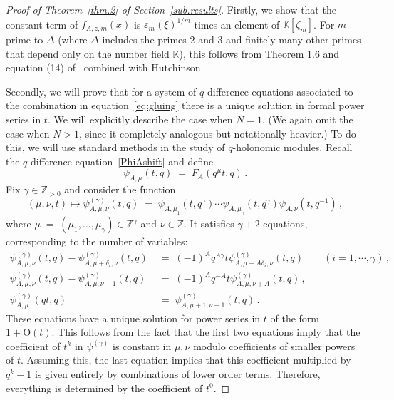 \documentclass[12pt,reqno]{amsart}
\theoremstyle{definition}
\def\BZ{\mathbb Z}
\def\BK{\mathbb K}
\def\ve{\varepsilon}
\def\be{\begin{equation}}
\def\ee{\end{equation}}
\def\z{\zeta}
\def\={\;=\;}
\def\Phitof{f}
\begin{document}
\begin{proof}[Proof of Theorem~\ref{thm.2} of Section~\ref{sub.results}]
Firstly, we show that the constant term of $\Phitof_{A,z,m}(x)$
is $\ve_m(\xi)^{1/m}$ times an element of $\BK[\z_m]$.
For $m$ prime to $\Delta$ (where $\Delta$ includes the primes $2$ and $3$ and
finitely many other primes that depend only on the number field $\BK$),
this follows from Theorem 1.6 and equation (14) of~\cite[Thm.1.6]{CGZ} combined
with Hutchinson~\cite{Hutchinson}.

Secondly, we will prove that for a system of $q$-difference equations
associated to the combination in equation~\eqref{eq:gluing}
there is a unique solution in formal power series in $t$. 
We will explicitly describe the case when $N=1$.
(We again omit the case when $N>1$, since it completely analogous but notationally
heavier.) To do this, we will use standard methods in the study of $q$-holonomic
modules. Recall the $q$-difference equation~\eqref{PhiAshift} and define
\be
\psi_{A,\mu}(t,q) \= F_{A}(q^\mu t,q)\,.
\ee
Fix $\gamma\in\BZ_{>0}$ and consider the function
\be
(\mu,\nu,t) \mapsto
\psi^{(\gamma)}_{A,\mu,\nu}(t,q) \=
\psi_{A,\mu_1}(t,q^\gamma)\cdots \psi_{A,\mu_\gamma}(t,q^{\gamma})
\psi_{A,\nu}(t,q^{-1})\,,
\ee
where $\mu \= (\mu_1,\dots,\mu_\gamma) \in \BZ^\gamma$ and $\nu \in \BZ$.
It satisfies $\gamma+2$ equations, corresponding to the number of variables:
\be
\label{eq:qdiff.proofs}
\begin{aligned}
\psi^{(\gamma)}_{A,\mu,\nu}(t,q)
-
\psi^{(\gamma)}_{A,\mu+\delta_i,\nu}(t,q)
&\=
(-1)^Aq^{A\gamma}t\psi^{(\gamma)}_{A,\mu+A\delta_i,\nu}(t,q)\qquad
(i=1,\cdots,\gamma)\,,\\
\psi^{(\gamma)}_{A,\mu,\nu}(t,q)
-
\psi^{(\gamma)}_{A,\mu,\nu+1}(t,q)
&\=
(-1)^Aq^{-A}t\psi^{(\gamma)}_{A,\mu,\nu+A}(t,q)\,,\\
\psi^{(\gamma)}_{A,\mu}(qt,q)
&\=
\psi^{(\gamma)}_{A,\mu+1,\nu-1}(t,q)\,.
\end{aligned}
\ee
These equations have a unique solution for power series in $t$
of the form $1+\mathrm{O}(t)$. This follows from the fact
that the first two equations imply that the coefficient of $t^k$
in $\psi^{(\gamma)}$ is constant in $\mu,
\nu$ modulo coefficients
of smaller powers of $t$. Assuming this, the last equation
implies that this coefficient multiplied by $q^k-1$ is given entirely
by combinations of lower order terms. Therefore,
everything is determined by the coefficient of $t^0$.


\end{proof}
\end{document}
